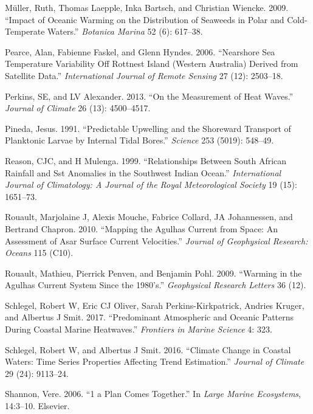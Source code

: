 \documentclass[10pt,a4paper,]{article}
\begin{document}
\leavevmode\hypertarget{ref-Muller2009}{}%
Müller, Ruth, Thomas Laepple, Inka Bartsch, and Christian Wiencke. 2009.
``Impact of Oceanic Warming on the Distribution of Seaweeds in Polar and
Cold-Temperate Waters.'' \emph{Botanica Marina} 52 (6): 617--38.

\leavevmode\hypertarget{ref-Pearce2006}{}%
Pearce, Alan, Fabienne Faskel, and Glenn Hyndes. 2006. ``Nearshore Sea
Temperature Variability Off Rottnest Island (Western Australia) Derived
from Satellite Data.'' \emph{International Journal of Remote Sensing} 27
(12): 2503--18.

\leavevmode\hypertarget{ref-Perkins2013}{}%
Perkins, SE, and LV Alexander. 2013. ``On the Measurement of Heat
Waves.'' \emph{Journal of Climate} 26 (13): 4500--4517.

\leavevmode\hypertarget{ref-Pineda1991}{}%
Pineda, Jesus. 1991. ``Predictable Upwelling and the Shoreward Transport
of Planktonic Larvae by Internal Tidal Bores.'' \emph{Science} 253
(5019): 548--49.

\leavevmode\hypertarget{ref-Reason1999}{}%
Reason, CJC, and H Mulenga. 1999. ``Relationships Between South African
Rainfall and Sst Anomalies in the Southwest Indian Ocean.''
\emph{International Journal of Climatology: A Journal of the Royal
Meteorological Society} 19 (15): 1651--73.

\leavevmode\hypertarget{ref-Rouault2010}{}%
Rouault, Marjolaine J, Alexis Mouche, Fabrice Collard, JA Johannessen,
and Bertrand Chapron. 2010. ``Mapping the Agulhas Current from Space: An
Assessment of Asar Surface Current Velocities.'' \emph{Journal of
Geophysical Research: Oceans} 115 (C10).

\leavevmode\hypertarget{ref-Rouault2009}{}%
Rouault, Mathieu, Pierrick Penven, and Benjamin Pohl. 2009. ``Warming in
the Agulhas Current System Since the 1980's.'' \emph{Geophysical
Research Letters} 36 (12).

\leavevmode\hypertarget{ref-Schlegel2017}{}%
Schlegel, Robert W, Eric CJ Oliver, Sarah Perkins-Kirkpatrick, Andries
Kruger, and Albertus J Smit. 2017. ``Predominant Atmospheric and Oceanic
Patterns During Coastal Marine Heatwaves.'' \emph{Frontiers in Marine
Science} 4: 323.

\leavevmode\hypertarget{ref-Schlegel2016}{}%
Schlegel, Robert W, and Albertus J Smit. 2016. ``Climate Change in
Coastal Waters: Time Series Properties Affecting Trend Estimation.''
\emph{Journal of Climate} 29 (24): 9113--24.

\leavevmode\hypertarget{ref-Shannon2006}{}%
Shannon, Vere. 2006. ``1 a Plan Comes Together.'' In \emph{Large Marine
Ecosystems}, 14:3--10. Elsevier.
\end{document}
